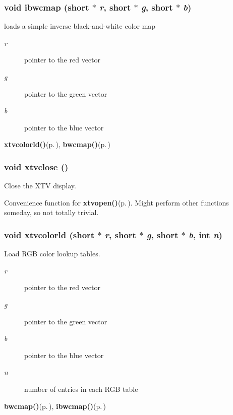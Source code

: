 \subsubsection{\setlength{\rightskip}{0pt plus 5cm}void ibwcmap (short $\ast$ {\em r}, short $\ast$ {\em g}, short $\ast$ {\em b})}\label{xtv_8c_a8}


loads a simple inverse black-and-white color map 

\begin{Desc}
\item[Parameters:]
\begin{description}
\item[{\em r}]pointer to the red vector \item[{\em g}]pointer to the green vector \item[{\em b}]pointer to the blue vector\end{description}
\end{Desc}
\begin{Desc}
\item[See also:]{\bf xtvcolorld()}{\rm (p.\,\pageref{xtv_8c_a6})}, {\bf bwcmap()}{\rm (p.\,\pageref{xtv_8c_a7})} \end{Desc}
\subsubsection{\setlength{\rightskip}{0pt plus 5cm}void xtvclose ()}\label{xtv_8c_a4}


Close the XTV display. 

Convenience function for {\bf xtvopen()}{\rm (p.\,\pageref{xtv_8c_a3})}. Might perform other functions someday, so not totally trivial. 
\subsubsection{\setlength{\rightskip}{0pt plus 5cm}void xtvcolorld (short $\ast$ {\em r}, short $\ast$ {\em g}, short $\ast$ {\em b}, int {\em n})}\label{xtv_8c_a6}


Load RGB color lookup tables. 

\begin{Desc}
\item[Parameters:]
\begin{description}
\item[{\em r}]pointer to the red vector \item[{\em g}]pointer to the green vector \item[{\em b}]pointer to the blue vector \item[{\em n}]number of entries in each RGB table\end{description}
\end{Desc}
\begin{Desc}
\item[See also:]{\bf bwcmap()}{\rm (p.\,\pageref{xtv_8c_a7})}, {\bf ibwcmap()}{\rm (p.\,\pageref{xtv_8c_a8})} \end{Desc}
